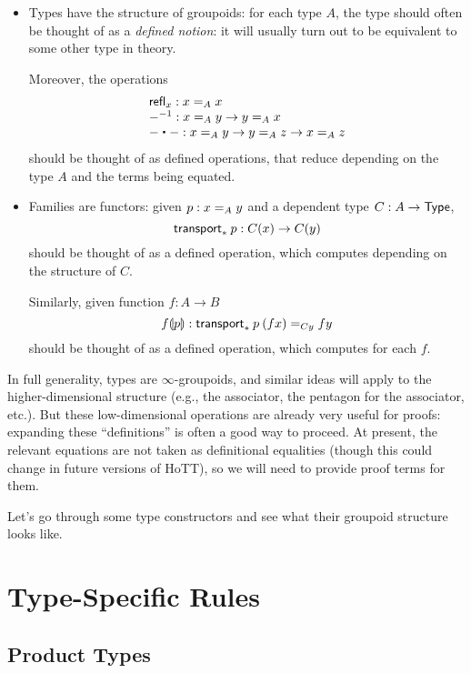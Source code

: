 \begin{itemize}

\item Types have the structure of groupoids: for each type $A$, the
  type  should often be thought of as a \emph{defined notion}: it
  will usually turn out to be equivalent to some other type in theory.  
  
  Moreover, the operations 
  \[
  \begin{array}{l}
    \refl{x} : \id[A]{x}{x} \\
    \opp{-} : \id[A]{x}{y} \to \id[A]{y}{x} \\
    - \ct - : \id[A]{x}{y} \to \id[A]{y}{z} \to \id[A]{x}{z} \\ 
  \end{array}
  \]
  should be thought of as defined operations, that reduce depending on
  the type $A$ and the terms being equated.  

\item Families are functors: given $p : \id[A]{x}{y}$ and a dependent type
  $C : A \to \type$,
  \[
    \transport{C}{p} : C(x) \to C(y)
  \]
  should be thought of as a defined operation, which computes depending
  on the structure of $C$.  

  Similarly, given function $f : A \to B$
  \[
    \mapdep{f}{p} : \id[C y]{\transport{C}{p} \: (f x)}{f y}
  \]
  should be thought of as a defined operation, which computes for each
  $f$.  

\end{itemize}

In full generality, types are $\infty$-groupoids, and similar ideas will
apply to the higher-dimensional structure (e.g., the associator, the
pentagon for the associator, etc.).  But these low-dimensional
operations are already very useful for proofs: expanding these
``definitions'' is often a good way to proceed.  At present, the
relevant equations are not taken as definitional equalities (though this
could change in future versions of HoTT), so we will need to provide
proof terms for them.  

Let's go through some type constructors and see what their groupoid
structure looks like.

\section{Type-Specific Rules}

\subsection{Product Types}


